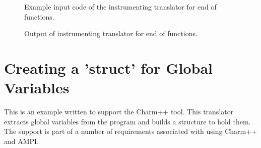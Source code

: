 \begin{figure}[!ht]
{\indent
{\mySmallFontSize

\begin{latexonly}
   
\end{latexonly}

\begin{htmlonly}
   
\end{htmlonly}

}
}
\caption{Example input code of the instrumenting translator for end of
functions.}
\label{Tutorial:inputCode_instrumentEndOfFunction}
\end{figure}

\begin{figure}[!ht]
{\indent
{\mySmallFontSize


\begin{latexonly}
   
\end{latexonly}

\begin{htmlonly}
   
\end{htmlonly}

}
}

\caption{Output of instrumenting translator for end of functions.}
\label{Tutorial:rose_inputCode_instrumentEndOfFunction}
\end{figure}

\section{Creating a 'struct' for Global Variables}
   This is an example written to support the Charm++ tool. This translator
extracts global variables from the program and builds a structure to hold them.
The support is part of a number of requirements associated with using Charm++
and AMPI.

